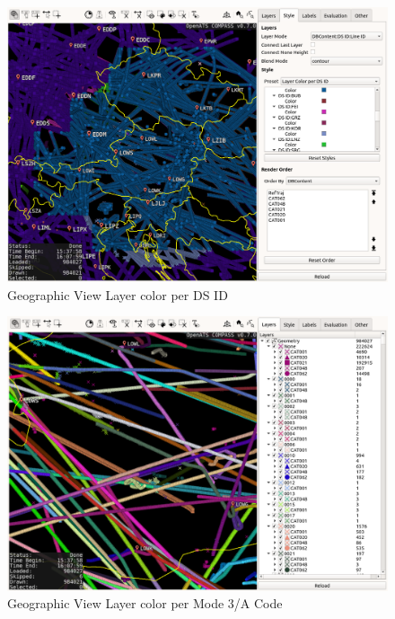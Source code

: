 \begin{figure}[H]
    \hspace*{-2.5cm}
    \includegraphics[width=19cm,frame]{figures/geoview_style_ds_id.png}
  \caption{Geographic View Layer color per DS ID}
\end{figure}

\begin{figure}[H]
    \hspace*{-2.5cm}
    \includegraphics[width=19cm,frame]{figures/geoview_style_mode3a_code.png}
  \caption{Geographic View Layer color per Mode 3/A Code}
\end{figure}

